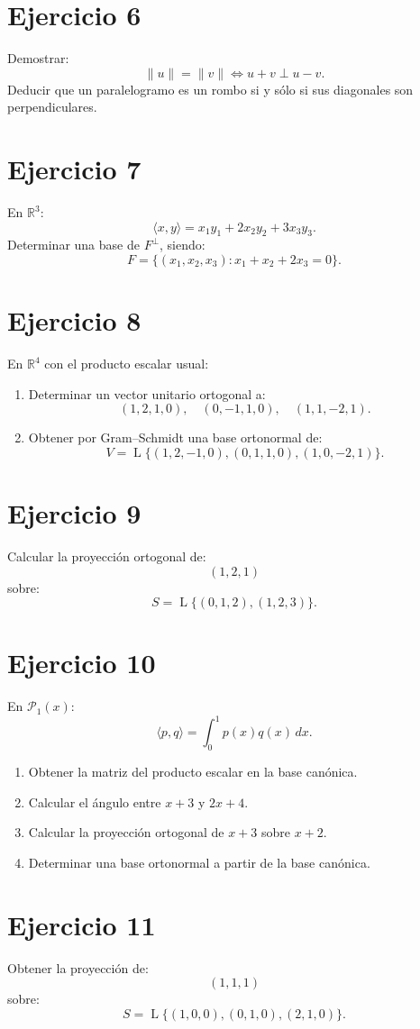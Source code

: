 \documentclass[11pt,a4paper]{article}
\newcommand{\R}{\mathbb{R}}
\newcommand{\Span}{\operatorname{L}}
\begin{document}
\section{Ejercicio 6}
Demostrar:
\[
\|u\|=\|v\|
\iff
u+v\perp u-v.
\]
Deducir que un paralelogramo es un rombo si y sólo si sus diagonales son perpendiculares.

\section{Ejercicio 7}
En $\R^3$:
\[
\langle x,y\rangle
=
x_1y_1+2x_2y_2+3x_3y_3.
\]
Determinar una base de $F^\perp$, siendo:
\[
F=\{(x_1,x_2,x_3):x_1+x_2+2x_3=0\}.
\]

\section{Ejercicio 8}
En $\R^4$ con el producto escalar usual:
\begin{enumerate}[label=\alph*)]
\item Determinar un vector unitario ortogonal a:
\[
(1,2,1,0),\quad(0,-1,1,0),\quad(1,1,-2,1).
\]
\item Obtener por Gram--Schmidt una base ortonormal de:
\[
V=
\Span\{(1,2,-1,0),(0,1,1,0),(1,0,-2,1)\}.
\]
\end{enumerate}

\section{Ejercicio 9}
Calcular la proyección ortogonal de:
\[
(1,2,1)
\]
sobre:
\[
S=
\Span\{(0,1,2),(1,2,3)\}.
\]

\section{Ejercicio 10}
En $\mathcal P_1(x)$:
\[
\langle p,q\rangle
=
\int_0^1p(x)q(x)\,dx.
\]
\begin{enumerate}[label=\alph*)]
\item Obtener la matriz del producto escalar en la base canónica.
\item Calcular el ángulo entre $x+3$ y $2x+4$.
\item Calcular la proyección ortogonal de $x+3$ sobre $x+2$.
\item Determinar una base ortonormal a partir de la base canónica.
\end{enumerate}

\section{Ejercicio 11}
Obtener la proyección de:
\[
(1,1,1)
\]
sobre:
\[
S=
\Span\{(1,0,0),(0,1,0),(2,1,0)\}.
\]
\end{document}
